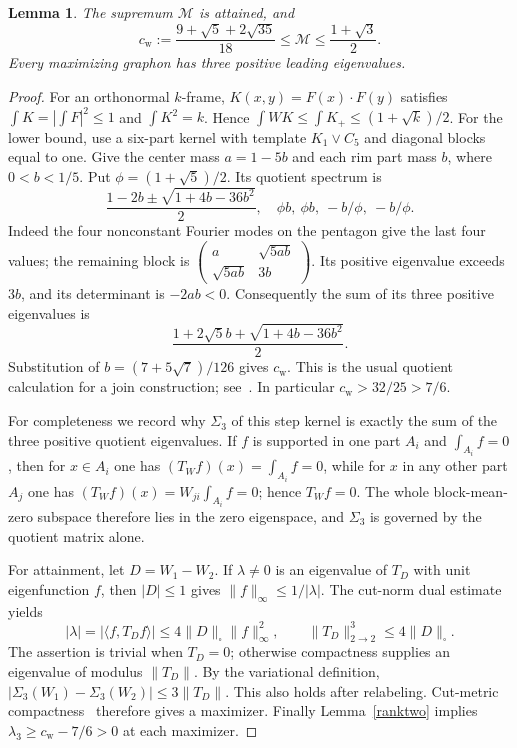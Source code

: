 \documentclass[11pt]{article}
\newtheorem{lemma}[theorem]{Lemma}
\theoremstyle{remark}\newtheorem{remark}[theorem]{Remark}
\newcommand{\cstar}{c_{\mathrm{w}}}
\numberwithin{equation}{section}
\begin{document}
\begin{lemma}\label{attainment}
The supremum $\mathcal M$ is attained, and
\[
 \cstar:=\frac{9+\sqrt5+2\sqrt{35}}{18}\le\mathcal M
       \le\frac{1+\sqrt3}{2}.
\]
Every maximizing graphon has three positive leading eigenvalues.
\end{lemma}
\begin{proof}
For an orthonormal $k$-frame, $K(x,y)=F(x)\cdot F(y)$ satisfies
$\int K=|\int F|^2\le1$ and $\int K^2=k$. Hence
$\int WK\le\int K_+\le(1+\sqrt k)/2$.
For the lower bound, use a six-part kernel with template $K_1\vee C_5$
and diagonal blocks equal to one. Give the center mass $a=1-5b$ and each
rim part mass $b$, where $0<b<1/5$. Put $\phi=(1+\sqrt5)/2$.
Its quotient spectrum is
\[
 \frac{1-2b\pm\sqrt{1+4b-36b^2}}2,
 \quad\phi b,\ \phi b,\ -b/\phi,\ -b/\phi.
\]
Indeed the four nonconstant Fourier modes on the pentagon give the last
four values; the remaining block is
$\left(\begin{smallmatrix}a&\sqrt{5ab}\\\sqrt{5ab}&3b\end{smallmatrix}\right)$.
Its positive eigenvalue exceeds $3b$, and its determinant is $-2ab<0$.
Consequently the sum of its three positive eigenvalues is
\[
 \frac{1+2\sqrt5 b+\sqrt{1+4b-36b^2}}2.
\]
Substitution of $b=(7+5\sqrt7)/126$ gives $\cstar$.
This is the usual quotient calculation for a join construction;
see~\cite{Hjoin}. In particular $\cstar>32/25>7/6$.

For completeness we record why $\Sigma_3$ of this step kernel is exactly the
sum of the three positive quotient eigenvalues. If $f$ is supported in one
part $A_i$ and $\int_{A_i}f=0$, then for $x\in A_i$ one has
$(T_Wf)(x)=\int_{A_i}f=0$, while for $x$ in any other part $A_j$ one has
$(T_Wf)(x)=W_{ji}\int_{A_i}f=0$; hence $T_Wf=0$. The whole block-mean-zero
subspace therefore lies in the zero eigenspace, and $\Sigma_3$ is governed
by the quotient matrix alone.

For attainment, let $D=W_1-W_2$. If $\lambda\ne0$ is an eigenvalue of
$T_D$ with unit eigenfunction $f$, then $|D|\le1$ gives
$\|f\|_\infty\le1/|\lambda|$. The cut-norm dual estimate yields
\[
 |\lambda|=|\langle f,T_Df\rangle|
 \le4\|D\|_\square\|f\|_\infty^2,
 \qquad \|T_D\|_{2\to2}^3\le4\|D\|_\square.
\]
The assertion is trivial when $T_D=0$; otherwise compactness supplies an
eigenvalue of modulus $\|T_D\|$. By the variational definition,
$|\Sigma_3(W_1)-\Sigma_3(W_2)|\le3\|T_D\|$. This also holds after
relabeling. Cut-metric compactness~\cite{LS} therefore gives a maximizer.
Finally Lemma~\ref{ranktwo} implies
$\lambda_3\ge\cstar-7/6>0$ at each maximizer.
\end{proof}
\end{document}
